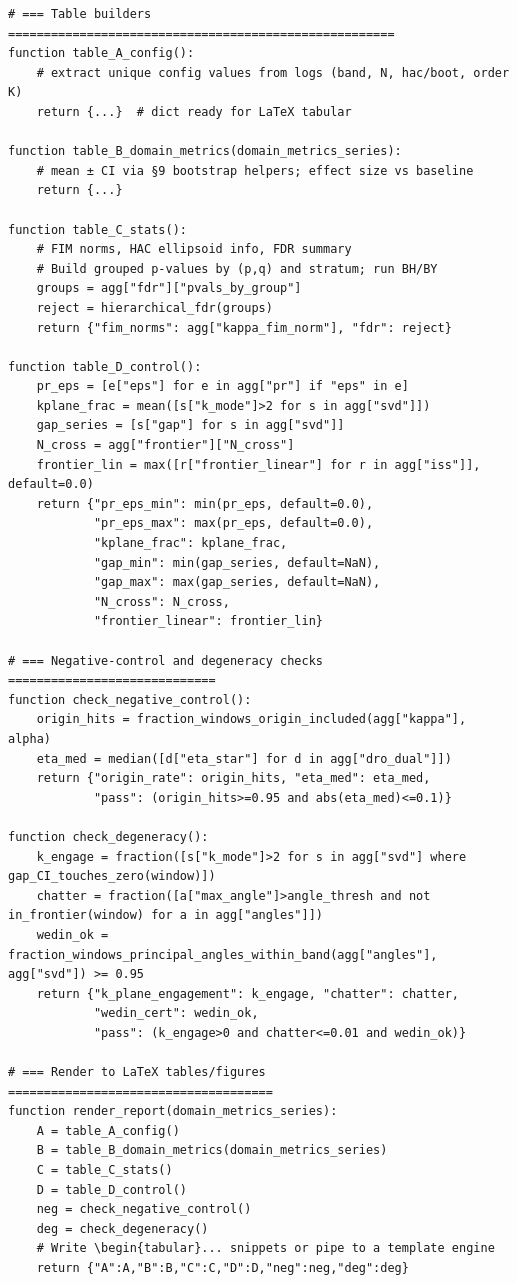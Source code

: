 \documentclass[10pt]{article}
\begin{document}
\begin{lstlisting}
# === Table builders ======================================================
function table_A_config():
    # extract unique config values from logs (band, N, hac/boot, order K)
    return {...}  # dict ready for LaTeX tabular

function table_B_domain_metrics(domain_metrics_series):
    # mean ± CI via §9 bootstrap helpers; effect size vs baseline
    return {...}

function table_C_stats():
    # FIM norms, HAC ellipsoid info, FDR summary
    # Build grouped p-values by (p,q) and stratum; run BH/BY
    groups = agg["fdr"]["pvals_by_group"]
    reject = hierarchical_fdr(groups)
    return {"fim_norms": agg["kappa_fim_norm"], "fdr": reject}

function table_D_control():
    pr_eps = [e["eps"] for e in agg["pr"] if "eps" in e]
    kplane_frac = mean([s["k_mode"]>2 for s in agg["svd"]])
    gap_series = [s["gap"] for s in agg["svd"]]
    N_cross = agg["frontier"]["N_cross"]
    frontier_lin = max([r["frontier_linear"] for r in agg["iss"]], default=0.0)
    return {"pr_eps_min": min(pr_eps, default=0.0),
            "pr_eps_max": max(pr_eps, default=0.0),
            "kplane_frac": kplane_frac,
            "gap_min": min(gap_series, default=NaN),
            "gap_max": max(gap_series, default=NaN),
            "N_cross": N_cross,
            "frontier_linear": frontier_lin}

# === Negative-control and degeneracy checks =============================
function check_negative_control():
    origin_hits = fraction_windows_origin_included(agg["kappa"], alpha)
    eta_med = median([d["eta_star"] for d in agg["dro_dual"]])
    return {"origin_rate": origin_hits, "eta_med": eta_med,
            "pass": (origin_hits>=0.95 and abs(eta_med)<=0.1)}

function check_degeneracy():
    k_engage = fraction([s["k_mode"]>2 for s in agg["svd"] where gap_CI_touches_zero(window)])
    chatter = fraction([a["max_angle"]>angle_thresh and not in_frontier(window) for a in agg["angles"]])
    wedin_ok = fraction_windows_principal_angles_within_band(agg["angles"], agg["svd"]) >= 0.95
    return {"k_plane_engagement": k_engage, "chatter": chatter,
            "wedin_cert": wedin_ok,
            "pass": (k_engage>0 and chatter<=0.01 and wedin_ok)}

# === Render to LaTeX tables/figures =====================================
function render_report(domain_metrics_series):
    A = table_A_config()
    B = table_B_domain_metrics(domain_metrics_series)
    C = table_C_stats()
    D = table_D_control()
    neg = check_negative_control()
    deg = check_degeneracy()
    # Write \begin{tabular}... snippets or pipe to a template engine
    return {"A":A,"B":B,"C":C,"D":D,"neg":neg,"deg":deg}

\end{lstlisting}
\end{document}
